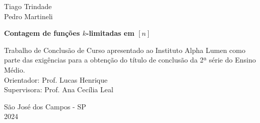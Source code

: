 \begin{center}
  Tiago Trindade\\Pedro Martineli
\end{center}
\vspace{7cm}
\begin{center}
  \large \textbf{Contagem de funções \texorpdfstring{$k$}{k}-limitadas em \texorpdfstring{$[n]$}{[n]}}
\end{center}
\vspace{5cm}
\begin{flushright}
  \parbox{0.45\linewidth}{\sloppy
    Trabalho de Conclusão de Curso apresentado ao Instituto Alpha Lumen como parte das                 exigências para a obtenção do título de conclusão da 2ª série do Ensino Médio. \\[10pt]
    Orientador: Prof. Lucas Henrique \\[5pt]
    Supervisora: Prof. Ana Cecília Leal
  }
\end{flushright}
\vspace{4cm}
\begin{center}
  \normalsize São José dos Campos - SP\\2024
\end{center}
